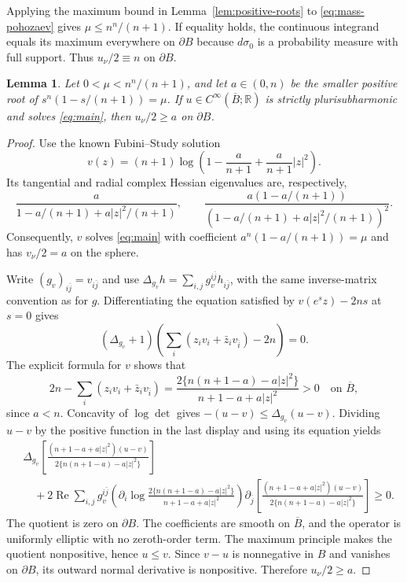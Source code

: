 \documentclass[11pt]{article}
\newtheorem{lemma}[theorem]{Lemma}
\newcommand{\R}{\mathbb R}
\begin{document}
Applying the maximum bound in Lemma~\ref{lem:positive-roots} to
\eqref{eq:mass-pohozaev} gives $\mu\le n^n/(n+1)$. If equality holds,
the continuous integrand equals its maximum everywhere on $\partial B$
because $d\sigma_0$ is a probability measure with full support. Thus
$u_\nu/2\equiv n$ on $\partial B$.

\begin{lemma}\label{lem:lower-slope}
Let $0<\mu<n^n/(n+1)$, and let $a\in(0,n)$ be the smaller
positive root of $s^n(1-s/(n+1))=\mu$.
If $u\in C^\infty(\overline B;\R)$ is strictly plurisubharmonic
and solves \eqref{eq:main}, then $u_\nu/2\ge a$ on $\partial B$.
\end{lemma}

\begin{proof}
Use the known Fubini--Study solution \cite{Li2016}
$$
 v(z)=(n+1)\log\left(1-\frac a{n+1}+\frac a{n+1}|z|^2\right).
$$
Its tangential and radial complex Hessian eigenvalues are,
respectively,
$$
 \frac{a}{1-a/(n+1)+a|z|^2/(n+1)},\qquad
 \frac{a(1-a/(n+1))}{(1-a/(n+1)+a|z|^2/(n+1))^2}.
$$
Consequently, $v$ solves \eqref{eq:main} with coefficient
$a^n(1-a/(n+1))=\mu$ and has $v_\nu/2=a$ on the sphere.

Write $(g_v)_{i\bar j}=v_{i\bar j}$ and use
$\Delta_{g_v}h=\sum_{i,j}g_v^{i\bar j}h_{i\bar j}$, with the same
inverse-matrix convention as for $g$. Differentiating the equation
satisfied by $v(e^sz)-2ns$ at $s=0$ gives
$$
 (\Delta_{g_v}+1)\left(\sum_i(z_iv_i+\bar z_iv_{\bar i})-2n\right)=0.
$$
The explicit formula for $v$ shows that
$$
 2n-\sum_i(z_iv_i+\bar z_iv_{\bar i})
 =\frac{2\{n(n+1-a)-a|z|^2\}}{n+1-a+a|z|^2}>0
 \quad\text{on }\overline B,
$$
since $a<n$. Concavity of $\log\det$ gives
$-(u-v)\le\Delta_{g_v}(u-v)$. Dividing $u-v$ by the positive
function in the last display and using its equation yields
\begin{align*}
 &\Delta_{g_v}\left[
 \frac{(n+1-a+a|z|^2)(u-v)}{2\{n(n+1-a)-a|z|^2\}}\right]\\
 &\quad+2\operatorname{Re}\sum_{i,j}g_v^{i\bar j}
 \left(\partial_i\log\frac{2\{n(n+1-a)-a|z|^2\}}
 {n+1-a+a|z|^2}\right)
 \partial_{\bar j}\left[
 \frac{(n+1-a+a|z|^2)(u-v)}{2\{n(n+1-a)-a|z|^2\}}\right]\ge0.
\end{align*}
The quotient is zero on $\partial B$. The coefficients are smooth
on $\overline B$, and the operator is uniformly elliptic with no
zeroth-order term. The maximum principle makes the quotient
nonpositive, hence $u\le v$. Since $v-u$ is nonnegative in $B$
and vanishes on $\partial B$, its outward normal derivative is
nonpositive. Therefore $u_\nu/2\ge a$.
\end{proof}
\end{document}
